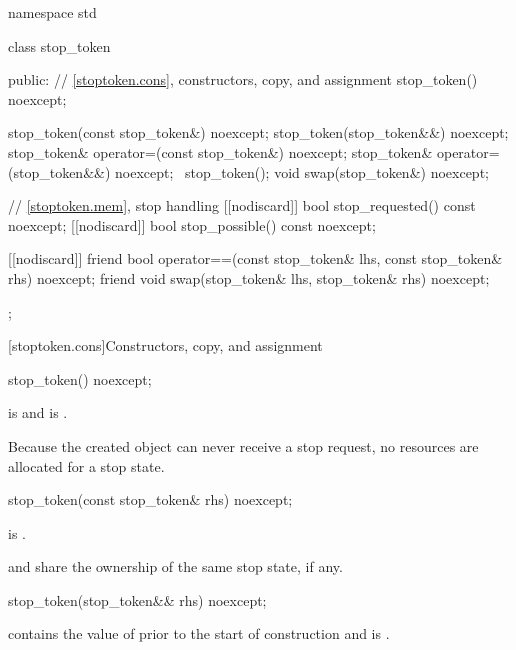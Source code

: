 \begin{codeblock}
namespace std {
  class stop_token {
  public:
    // \ref{stoptoken.cons}, constructors, copy, and assignment
    stop_token() noexcept;

    stop_token(const stop_token&) noexcept;
    stop_token(stop_token&&) noexcept;
    stop_token& operator=(const stop_token&) noexcept;
    stop_token& operator=(stop_token&&) noexcept;
    ~stop_token();
    void swap(stop_token&) noexcept;

    // \ref{stoptoken.mem}, stop handling
    [[nodiscard]] bool stop_requested() const noexcept;
    [[nodiscard]] bool stop_possible() const noexcept;

    [[nodiscard]] friend bool operator==(const stop_token& lhs, const stop_token& rhs) noexcept;
    friend void swap(stop_token& lhs, stop_token& rhs) noexcept;
  };
}
\end{codeblock}


[stoptoken.cons]{Constructors, copy, and assignment}

%
\begin{itemdecl}
stop_token() noexcept;
\end{itemdecl}

\begin{itemdescr}
\pnum
\ensures
{} is  and
 is .
\begin{note}
Because the created  object can never receive a stop request,
no resources are allocated for a stop state.
\end{note}
\end{itemdescr}

%
\begin{itemdecl}
stop_token(const stop_token& rhs) noexcept;
\end{itemdecl}

\begin{itemdescr}
\pnum
\ensures
{} is .
\begin{note}
 and  share the ownership of the same stop state,
if any.
\end{note}
\end{itemdescr}

%
\begin{itemdecl}
stop_token(stop_token&& rhs) noexcept;
\end{itemdecl}
\begin{itemdescr}
\pnum
\ensures
{} contains the value of 
prior to the start of construction
and  is .
\end{itemdescr}

